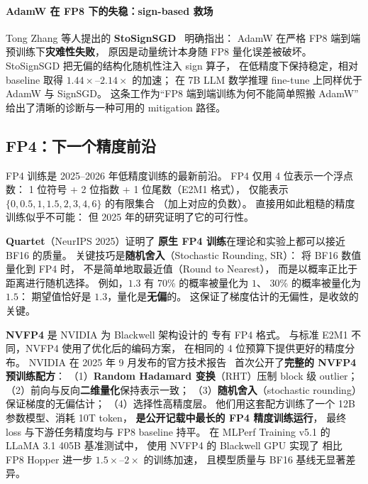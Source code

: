 \paragraph{AdamW 在 FP8 下的失稳：sign-based 救场}
Tong Zhang 等人提出的 \textbf{StoSignSGD}~\cite{stosignsgd2026}
明确指出：
AdamW 在严格 FP8 端到端预训练下\textbf{灾难性失败}，
原因是动量统计本身随 FP8 量化误差被破坏。
StoSignSGD 把无偏的结构化随机性注入 sign 算子，
在低精度下保持稳定，相对 baseline 取得
$1.44\times$--$2.14\times$ 的加速；
在 7B LLM 数学推理 fine-tune 上同样优于 AdamW 与 SignSGD。
这条工作为“FP8 端到端训练为何不能简单照搬 AdamW”
给出了清晰的诊断与一种可用的 mitigation 路径。

\subsection{FP4：下一个精度前沿}
\label{sec:fp4-training}

FP4 训练是 2025--2026 年低精度训练的最新前沿。
FP4 仅用 4 位表示一个浮点数：
1 位符号 + 2 位指数 + 1 位尾数（E2M1 格式），
仅能表示 $\{0, 0.5, 1, 1.5, 2, 3, 4, 6\}$ 的有限集合
（加上对应的负数）。
直接用如此粗糙的精度训练似乎不可能：
但 2025 年的研究证明了它的可行性。

\textbf{Quartet}（NeurIPS 2025）证明了%
\textbf{原生 FP4 训练}在理论和实验上都可以接近 BF16 的质量。
关键技巧是\textbf{随机舍入}（Stochastic Rounding, SR）：
将 BF16 数值量化到 FP4 时，
不是简单地取最近值（Round to Nearest），
而是以概率正比于距离进行随机选择。
例如，$1.3$ 有 70\% 的概率被量化为 $1$、
30\% 的概率被量化为 $1.5$：
期望值恰好是 $1.3$，量化是\textbf{无偏}的。
这保证了梯度估计的无偏性，是收敛的关键。

\textbf{NVFP4} 是 NVIDIA 为 Blackwell 架构设计的
专有 FP4 格式。%
与标准 E2M1 不同，NVFP4 使用了优化后的编码方案，
在相同的 4 位预算下提供更好的精度分布。
NVIDIA 在 2025 年 9 月发布的官方技术报告~\cite{nvfp4_2025}
首次公开了\textbf{完整的 NVFP4 预训练配方}：
（1）\textbf{Random Hadamard 变换}（RHT）压制 block 级 outlier；
（2）前向与反向\textbf{二维量化}保持表示一致；
（3）\textbf{随机舍入}（stochastic rounding）保证梯度的无偏估计；
（4）选择性高精度层。
他们用这套配方训练了一个 12B 参数模型、消耗 10T token，
\textbf{是公开记载中最长的 FP4 精度训练运行}，
最终 loss 与下游任务精度均与 FP8 baseline 持平。
在 MLPerf Training v5.1 的 LLaMA 3.1 405B 基准测试中，
使用 NVFP4 的 Blackwell GPU 实现了
相比 FP8 Hopper 进一步 $1.5\times$--$2\times$ 的训练加速，
且模型质量与 BF16 基线无显著差异。

